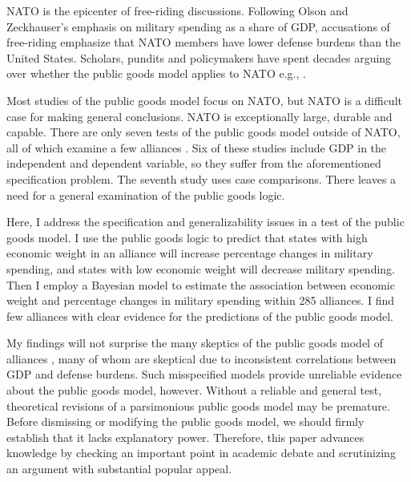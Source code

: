 \documentclass[12pt]{article}
\begin{document}
NATO is the epicenter of free-riding discussions. 
Following Olson and Zeckhauser's emphasis on military spending as a share of GDP, accusations of free-riding emphasize that NATO members have lower defense burdens than the United States. 
Scholars, pundits and policymakers have spent decades arguing over whether the public goods model applies to NATO e.g., \citep{SandlerForbes1980, Palmer1990, Boyer1993, GatesTerasawa1992, SandlerHartley2001, Lanoszka2015, PluemperNeumayer2015}.


Most studies of the public goods model focus on NATO, but NATO is a difficult case for making general conclusions. 
NATO is exceptionally large, durable and capable. 
There are only seven tests of the public goods model outside of NATO, all of which examine a few alliances \citep{Russett1970, Starr1974, Reisinger1983, Thies1987, ConybeareSandler1990, OnealWhatley1996, Siroky2012}. 
Six of these studies include GDP in the independent and dependent variable, so they suffer from the aforementioned specification problem.
The seventh study uses case comparisons.
There leaves a need for a general examination of the public goods logic. 


Here, I address the specification and generalizability issues in a test of the public goods model.  
I use the public goods logic to predict that states with high economic weight in an alliance will increase percentage changes in military spending, and states with low economic weight will decrease military spending.
Then I employ a Bayesian model to estimate the association between economic weight and percentage changes in military spending within 285 alliances. 
I find few alliances with clear evidence for the predictions of the public goods model. 


My findings will not surprise the many skeptics of the public goods model of alliances \citep{Palmer1990, GatesTerasawa1992, SandlerHartley2001, Norrlof2010, NiouZeigler2019}, many of whom are skeptical due to inconsistent correlations between GDP and defense burdens. 
Such misspecified models provide unreliable evidence about the public goods model, however. 
Without a reliable and general test, theoretical revisions of a parsimonious public goods model may be premature.
Before dismissing or modifying the public goods model, we should firmly establish that it lacks explanatory power.
Therefore, this paper advances knowledge by checking an important point in academic debate and scrutinizing an argument with substantial popular appeal. 
\end{document}
